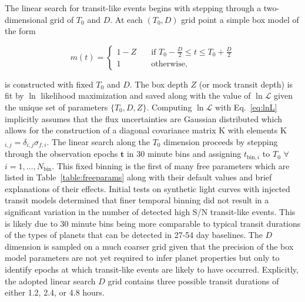 The linear search for transit-like events begins with stepping through
a two-dimensional grid of $T_0$ and $D$. At each $(T_0,D)$ grid point a simple box model of the form

\begin{equation}
  m(t) =
  \begin{cases}
    1-Z & \quad \text{if } T_0-\frac{D}{2} \leq t \leq T_0+\frac{D}{2} \\
    1 & \quad \text{otherwise,}
  \end{cases}
\end{equation}

\noindent is constructed with fixed $T_0$ and $D$. The box depth $Z$ (or mock transit depth)
is fit by $\ln$ likelihood maximization and saved along with the value of $\ln{\mathcal{L}}$
given the unique set of parameters $\{T_0,D,Z\}$. Computing $\ln{\mathcal{L}}$ with Eq.~\ref{eq:lnL}
implicitly assumes that the flux uncertainties are Gaussian distributed which allows for the
construction of a diagonal covariance matrix K with elements K$_{i,j} = \delta_{i,j} \sigma_{f,i}$.
The linear search along the $T_0$ dimension proceeds by stepping through the observation epochs
$\mathbf{t}$ in 30 minute bins and assigning
$t_{\text{bin},i}$ to $T_0$ $\forall$ $i=1,\dots,N_{\text{bin}}$.
This fixed binning is the first of many \pipeline{} free parameters which are listed in
Table~\ref{table:freeparams} along with their default values and brief explanations of their
effects. Initial \pipeline{} tests on synthetic light curves with injected transit models
determined that finer temporal binning did not result in a significant variation in the number
of detected high S/N transit-like events. This is likely due to 30 minute bins being more comparable
to typical transit durations of the types of planets that can be detected in 27-54 day baselines.
The $D$ dimension is sampled on a much coarser grid
given that the precision of the box model parameters are not yet required to infer planet properties
but only to identify epochs at which transit-like events are likely to have occurred. Explicitly, the
adopted linear search $D$ grid contains three possible transit durations of either 1.2, 2.4, or 4.8 hours.



